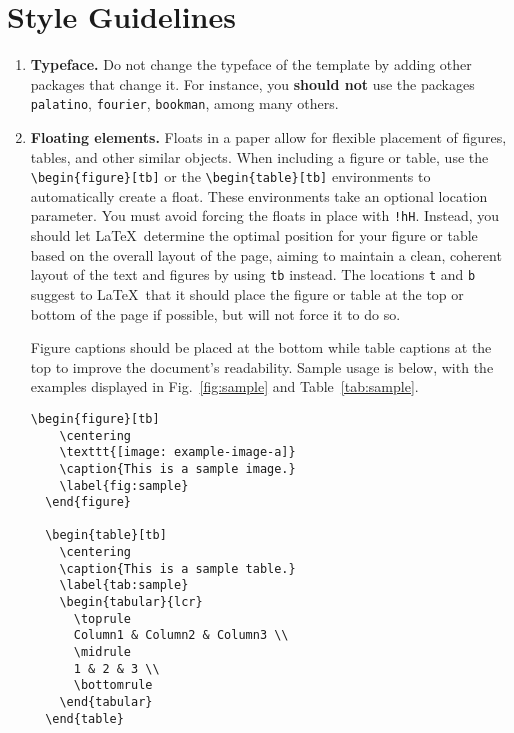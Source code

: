 \documentclass[fullpaper]{nldl}
\begin{document}
\section{Style Guidelines}

\begin{enumerate}[leftmargin=*]

\item \textbf{Typeface.}
Do not change the typeface of the template by adding other packages that change it.
For instance, you \textbf{should not} use the packages \verb|palatino|, \verb|fourier|, \verb|bookman|, among many others.

\item \textbf{Floating elements.}
Floats in a paper allow for flexible placement of figures, tables, and other similar objects.
When including a figure or table, use the \verb|\begin{figure}[tb]| or the \verb|\begin{table}[tb]| environments to automatically create a float.
These environments take an optional location parameter.
You must avoid forcing the floats in place with \verb|!hH|.
Instead, you should let \LaTeX\ determine the optimal position for your figure or table based on the overall layout of the page, aiming to maintain a clean, coherent layout of the text and figures by using \verb|tb| instead.
The locations \verb|t| and \verb|b| suggest to \LaTeX\ that it should place the figure or table at the top or bottom of the page if possible, but will not force it to do so.

Figure captions should be placed at the bottom while table captions at the top to improve the document's readability.
Sample usage is below, with the examples displayed in Fig.~\ref{fig:sample} and Table~\ref{tab:sample}.
\begin{lstlisting}[gobble=2]
  \begin{figure}[tb]
    \centering
    \texttt{[image: example-image-a]}
    \caption{This is a sample image.}
    \label{fig:sample}
  \end{figure}

  \begin{table}[tb]
    \centering
    \caption{This is a sample table.}
    \label{tab:sample}
    \begin{tabular}{lcr}
      \toprule
      Column1 & Column2 & Column3 \\
      \midrule
      1 & 2 & 3 \\
      \bottomrule
    \end{tabular}
  \end{table}
\end{lstlisting}


\end{enumerate}
\end{document}
